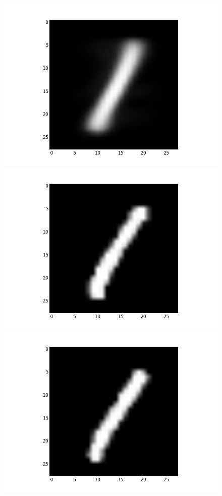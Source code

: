 \documentclass[submit]{harvardml}
\begin{document}
\begin{figure}[ht]
    \centering
    \includegraphics[scale=0.20]{K10-mean-3}
    \includegraphics[scale=0.20]{K10-representative-3-0}
    \includegraphics[scale=0.20]{K10-representative-3-1}

\end{figure}
\end{document}
